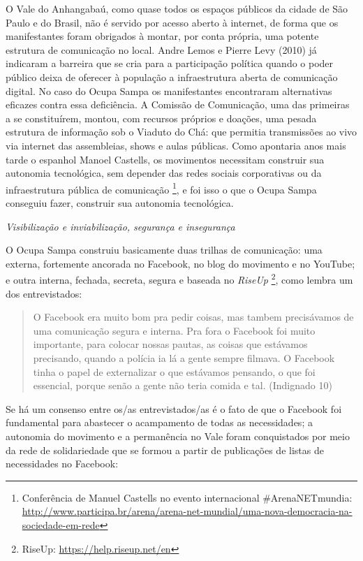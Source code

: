 O Vale do Anhangabaú, como quase todos os espaços públicos da cidade de
São Paulo e do Brasil, não é servido por acesso aberto à internet, de
forma que os manifestantes foram obrigados à montar, por conta própria,
uma potente estrutura de comunicação no local. Andre Lemos e Pierre Levy
(2010) já indicaram a barreira que se cria para a participação política
quando o poder público deixa de oferecer à população a infraestrutura
aberta de comunicação digital. No caso do Ocupa Sampa os manifestantes
encontraram alternativas eficazes contra essa deficiência. A Comissão de
Comunicação, uma das primeiras a se constituírem, montou, com recursos
próprios e doações, uma pesada estrutura de informação sob o Viaduto do
Chá: que permitia transmissões ao vivo via internet das assembleias,
shows e aulas públicas. Como apontaria anos mais tarde o espanhol Manoel
Castells, os movimentos necessitam construir sua autonomia tecnológica,
sem depender das redes sociais corporativas ou da infraestrutura pública
de comunicação \footnote{Conferência de Manuel Castells no evento
  internacional \#ArenaNETmundia:
  \url{http://www.participa.br/arena/arena-net-mundial/uma-nova-democracia-na-sociedade-em-rede}},
e foi isso o que o Ocupa Sampa conseguiu fazer, construir sua autonomia
tecnológica.

\emph{Visibilização e inviabilização, segurança e insegurança}

O Ocupa Sampa construiu basicamente duas trilhas de comunicação: uma
externa, fortemente ancorada no Facebook, no blog do movimento e no
YouTube; e outra interna, fechada, secreta, segura e baseada no
\emph{RiseUp} \footnote{RiseUp: \url{https://help.riseup.net/en}}, como
lembra um dos entrevistados:

\begin{quote}
O Facebook era muito bom pra pedir coisas, mas tambem precisávamos de
uma comunicação segura e interna. Pra fora o Facebook foi muito
importante, para colocar nossas pautas, as coisas que estávamos
precisando, quando a polícia ia lá a gente sempre filmava. O Facebook
tinha o papel de externalizar o que estávamos pensando, o que foi
essencial, porque senão a gente não teria comida e tal. (Indignado 10)
\end{quote}

Se há um consenso entre os/as entrevistados/as é o fato de que o
Facebook foi fundamental para abastecer o acampamento de todas as
necessidades; a autonomia do movimento e a permanência no Vale foram
conquistados por meio da rede de solidariedade que se formou a partir de
publicações de listas de necessidades no Facebook:

